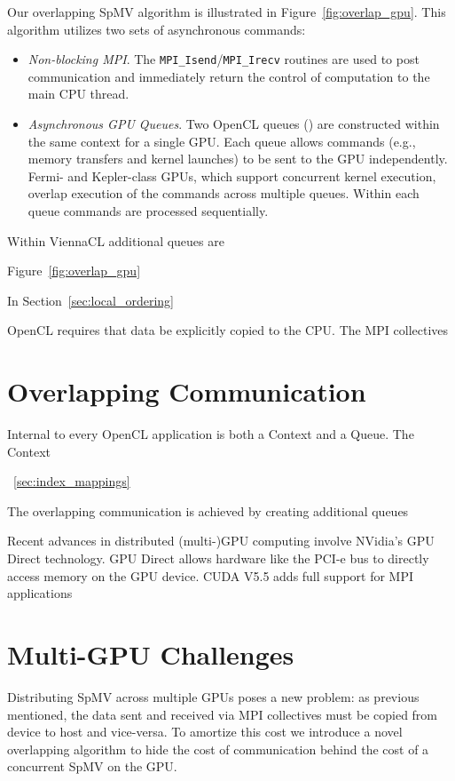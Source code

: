 Our overlapping SpMV algorithm is illustrated in Figure~\ref{fig:overlap_gpu}. This algorithm utilizes two sets of asynchronous commands: 
\begin{itemize} 
\item \emph{Non-blocking MPI}. The \texttt{MPI\_Isend}/\texttt{MPI\_Irecv} routines are used to post communication and immediately return the control of computation to the main CPU thread. 
\item \emph{Asynchronous GPU Queues}. Two OpenCL queues (\cite{Gerstmann2009}) are constructed within the same context for a single GPU. Each queue allows commands (e.g., memory transfers and kernel launches) to be sent to the GPU independently. Fermi- and Kepler-class GPUs, which support concurrent kernel execution, overlap execution of the commands across multiple queues. Within each queue commands are processed sequentially.
\end{itemize}


Within ViennaCL additional queues are 


Figure~\ref{fig:overlap_gpu}


In Section~\ref{sec:local_ordering}

OpenCL requires that data be explicitly copied to the CPU. The MPI collectives 



\section{Overlapping Communication}
Internal to every OpenCL application is both a Context and a Queue. The Context 

~\ref{sec:index_mappings}



The overlapping communication is achieved by creating additional queues 


Recent advances in distributed (multi-)GPU computing involve NVidia's GPU Direct technology. GPU Direct allows hardware like the PCI-e bus to directly access memory on the GPU device. CUDA V5.5 adds full support for MPI applications 



\section{Multi-GPU Challenges}

Distributing SpMV across multiple GPUs poses a new problem: as previous mentioned, the data sent and received via MPI collectives must be copied from device to host and vice-versa. To amortize this cost we introduce a novel overlapping algorithm to hide the cost of communication behind the cost of a concurrent SpMV on the GPU. 




